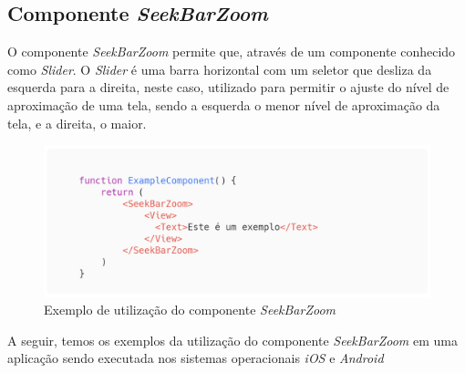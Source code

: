 \documentclass[
	12pt,				    %
	openright,			    %
	oneside,			    %
	a4paper,			    %
    sumario=tradicional,    %
	english,			    %
	brazil,				    %
	]{abntex2}              %
\begin{document}
\subsection{Componente \textit{SeekBarZoom}}

O componente \textit{SeekBarZoom} permite que, através de um componente conhecido como \textit{Slider}. O \textit{Slider} é uma barra horizontal com um seletor que desliza da esquerda para a direita, neste caso, utilizado para permitir o ajuste do nível de aproximação de uma tela, sendo a esquerda o menor nível de aproximação da tela, e a direita, o maior.

\begin{figure}[H]
	\begin{center}
		\includegraphics[width=.8\linewidth]{images/SeekBarZoom.png}
		\caption[Componente \textit{SeekBarZoom}]{Exemplo de utilização do componente \textit{SeekBarZoom}}
		\label{fig:seekBarZoomExample}
	\end{center}
\end{figure}

\par

A seguir, temos os exemplos da utilização do componente \textit{SeekBarZoom} em uma aplicação sendo executada nos sistemas operacionais \textit{iOS} e \textit{Android}
\end{document}
